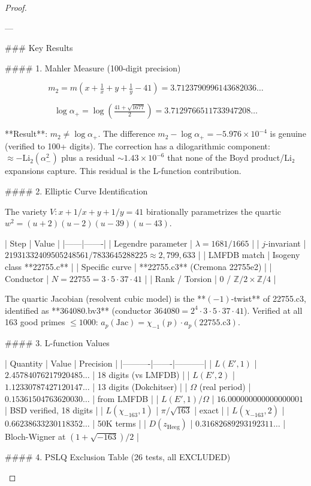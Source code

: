 \begin{theorem}
\begin{lemma}
\begin{proposition}
\begin{corollary}
\begin{proof}
\begin{remark}
---

### Key Results

#### 1. Mahler Measure (100-digit precision)

$$m_2 = m\!\left(x + \tfrac{1}{x} + y + \tfrac{1}{y} - 41\right) = 3.7123790996143682036\ldots$$

$$\log \alpha_+ = \log\!\left(\tfrac{41 + \sqrt{1677}}{2}\right) = 3.7129766511733947208\ldots$$

**Result**: $m_2 \neq \log\alpha_+$. The difference $m_2 - \log\alpha_+ = -5.976 \times 10^{-4}$ is genuine (verified to 100+ digits). The correction has a dilogarithmic component: $\approx -\text{Li}_2(\alpha_-^2)$ plus a residual $\sim 1.43 \times 10^{-6}$ that none of the Boyd product/Li₂ expansions capture. This residual is the L-function contribution.

#### 2. Elliptic Curve Identification

The variety $V\colon x+1/x+y+1/y=41$ birationally parametrizes the quartic $w^2 = (u+2)(u-2)(u-39)(u-43)$.

| Step | Value |
|------|-------|
| Legendre parameter | $\lambda = 1681/1665$ |
| $j$-invariant | $21931332409505248561/7833645288225 \approx 2{,}799{,}633$ |
| LMFDB match | Isogeny class **22755.c** |
| Specific curve | **22755.c3** (Cremona 22755e2) |
| Conductor | $N = 22755 = 3 \cdot 5 \cdot 37 \cdot 41$ |
| Rank / Torsion | $0$ / $\mathbb{Z}/2 \times \mathbb{Z}/4$ |

The quartic Jacobian (resolvent cubic model) is the **$(-1)$-twist** of 22755.c3, identified as **364080.bv3** (conductor $364080 = 2^4 \cdot 3 \cdot 5 \cdot 37 \cdot 41$). Verified at all 163 good primes $\leq 1000$: $a_p(\text{Jac}) = \chi_{-1}(p) \cdot a_p(\text{22755.c3})$.

#### 3. L-function Values

| Quantity | Value | Precision |
|----------|-------|-----------|
| $L(E', 1)$ | $2.45784076217920485\ldots$ | 18 digits (vs LMFDB) |
| $L(E', 2)$ | $1.12330787427120147\ldots$ | 13 digits (Dokchitser) |
| $\Omega$ (real period) | $0.15361504763620030\ldots$ | from LMFDB |
| $L(E',1)/\Omega$ | $16.000000000000000001$ | BSD verified, 18 digits |
| $L(\chi_{-163}, 1)$ | $\pi/\sqrt{163}$ | exact |
| $L(\chi_{-163}, 2)$ | $0.66238633230118352\ldots$ | 50K terms |
| $D(z_{\text{Heeg}})$ | $0.31682689293192311\ldots$ | Bloch-Wigner at $(1+\sqrt{-163})/2$ |

#### 4. PSLQ Exclusion Table (26 tests, all EXCLUDED)


\end{remark}
\end{proof}
\end{corollary}
\end{proposition}
\end{lemma}
\end{theorem}
